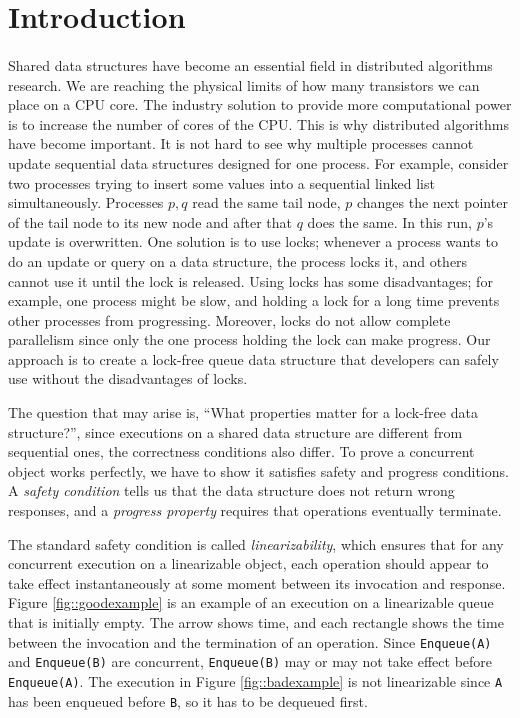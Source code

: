 \documentclass[12pt]{article}
\begin{document}
\pagebreak

\section{Introduction}

\paragraph{}
Shared data structures have become an essential field in distributed algorithms research.
We are reaching the physical limits of how many transistors we can place on a CPU core. The industry solution to provide more computational power is to increase the number of cores of the CPU. This is why distributed algorithms have become important. It is not hard to see why multiple processes cannot update sequential data structures designed for one process. For example, consider two processes trying to insert some values into a sequential linked list simultaneously. Processes $p,q$ read the same tail node, $p$ changes the next pointer of the tail node to its new node and after that $q$ does the same. In this run, $p$'s update is overwritten. One solution is to use locks; whenever a process wants to do an update or query on a data structure, the process locks it, and others cannot use it until the lock is released. Using locks has some disadvantages; for example, one process might be slow, and holding a lock for a long time prevents other processes from progressing. Moreover, locks do not allow complete parallelism since only the one process holding the lock can make progress. Our approach is to create a lock-free queue data structure that developers can safely use without the disadvantages of locks.


The question that may arise is, ``What properties matter for a lock-free data structure?'', since executions on a shared data structure are different from sequential ones, the correctness conditions also differ. To prove a concurrent object works perfectly, we have to show it satisfies safety and progress conditions. A \textit{safety condition} tells us that the data structure does not return wrong responses, and a \textit{progress property} requires that operations eventually terminate.

The standard safety condition is called \textit{linearizability}, which ensures that for any concurrent execution on a linearizable object, each operation should appear to take effect instantaneously at some moment between its invocation and response. Figure \ref{fig::goodexample} is an example of an execution on a linearizable  queue that is initially empty. The arrow shows time, and each rectangle shows the time between the invocation and the termination of an operation. Since \texttt{Enqueue(A)} and \texttt{Enqueue(B)} are concurrent, \texttt{Enqueue(B)} may or may not take effect before \texttt{Enqueue(A)}. The execution in Figure \ref{fig::badexample} is not linearizable since \texttt{A} has been enqueued before \texttt{B}, so it has to be dequeued first.
\end{document}
